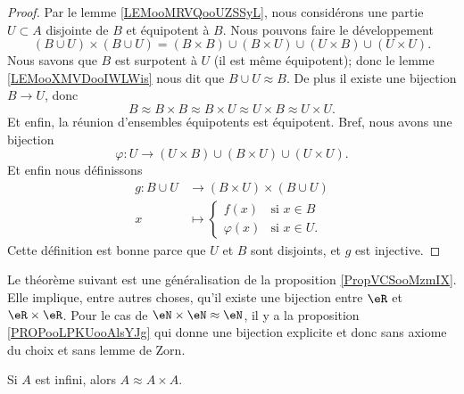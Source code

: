 \begin{proof}
    Par le lemme \ref{LEMooMRVQooUZSSyL}, nous considérons une partie \( U\subset A\) disjointe de \( B\) et équipotent à \( B\). Nous pouvons faire le développement
    \begin{equation}
        (B\cup U)\times (B\cup U)=(B\times B)\cup(B\times U)\cup (U\times B)\cup (U\times U).
    \end{equation}
    Nous savons que \( B\) est surpotent à \( U\) (il est même équipotent); donc le lemme \ref{LEMooXMVDooIWLWis} nous dit que \( B\cup U\approx B\). De plus il existe une bijection \( B\to U\), donc 
    \begin{equation}
        B\approx B\times B\approx B\times U\approx U\times B\approx U\times U.
    \end{equation}
    Et enfin, la réunion d'ensembles équipotents est équipotent. Bref, nous avons une bijection
    \begin{equation}
        \varphi\colon U\to (U\times B)\cup (B\times U)\cup (U\times U).
    \end{equation}
    Et enfin nous définissons
    \begin{equation}
        \begin{aligned}
            g\colon B\cup U&\to (B\times U)\times (B\cup U) \\
            x&\mapsto \begin{cases}
                f(x)    &   \text{si }  x\in B\\
                \varphi(x)    &    \text{si } x\in U.
            \end{cases}
        \end{aligned}
    \end{equation}
    Cette définition est bonne parce que \( U\) et \( B\) sont disjoints, et \( g\) est injective.
\end{proof}

Le théorème suivant est une généralisation de la proposition \ref{PropVCSooMzmIX}. Elle implique, entre autres choses, qu'il existe une bijection entre \( \eR\) et \( \eR\times \eR\). Pour le cas de \( \eN\times \eN\approx \eN\), il y a la proposition \ref{PROPooLPKUooAlsYJg} qui donne une bijection explicite et donc sans axiome du choix et sans lemme de Zorn.
\begin{theorem}     \label{THOooDGOVooRdURVi}
    Si \( A\) est infini, alors \( A\approx A\times A\).
\end{theorem}

